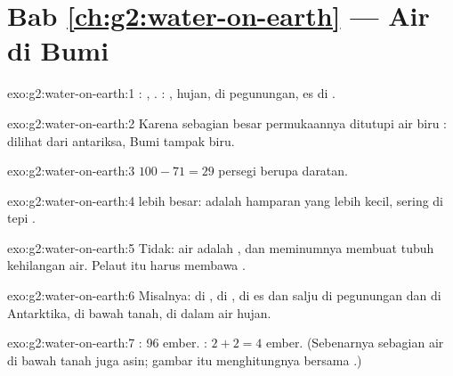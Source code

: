 \section*{Bab \ref{ch:g2:water-on-earth} --- Air di Bumi}

\begin{solution}{exo:g2:water-on-earth:1}
: , . : , hujan,  di pegunungan, es
di .
\end{solution}

\begin{solution}{exo:g2:water-on-earth:2}
Karena sebagian besar permukaannya ditutupi air biru : dilihat dari
antariksa, Bumi tampak biru.
\end{solution}

\begin{solution}{exo:g2:water-on-earth:3}
$100 - 71 = 29$ persegi berupa daratan.
\end{solution}

\begin{solution}{exo:g2:water-on-earth:4}
 lebih besar:  adalah hamparan  yang lebih kecil, sering
di tepi .
\end{solution}

\begin{solution}{exo:g2:water-on-earth:5}
Tidak: air  adalah , dan meminumnya membuat tubuh kehilangan
air. Pelaut itu harus membawa .
\end{solution}

\begin{solution}{exo:g2:water-on-earth:6}
Misalnya: di , di , di es dan salju di pegunungan dan di
Antarktika, di bawah tanah, di dalam air hujan.
\end{solution}

\begin{solution}{exo:g2:water-on-earth:7}
: 96 ember. : $2 + 2 = 4$ ember.
(Sebenarnya sebagian air di bawah tanah juga asin; gambar itu menghitungnya
bersama .)
\end{solution}

